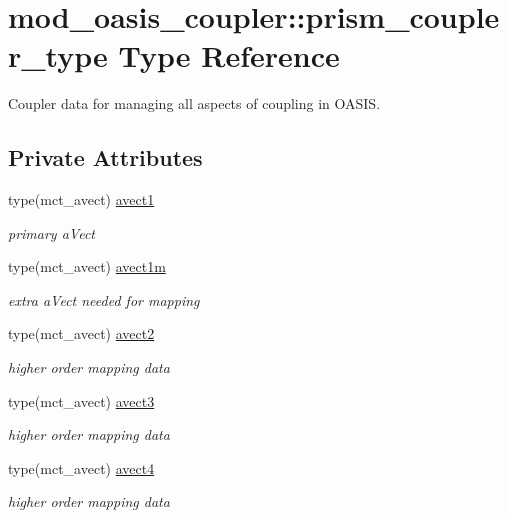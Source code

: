 \hypertarget{structmod__oasis__coupler_1_1prism__coupler__type}{\section{mod\+\_\+oasis\+\_\+coupler\+:\+:prism\+\_\+coupler\+\_\+type Type Reference}
\label{structmod__oasis__coupler_1_1prism__coupler__type}
}


Coupler data for managing all aspects of coupling in O\+A\+S\+I\+S.  


\subsection*{Private Attributes}
\begin{DoxyCompactItemize}
\item 
type(mct\+\_\+avect) \hyperlink{structmod__oasis__coupler_1_1prism__coupler__type_a153e0bf9e28c0a8ff4d8bb27c83f598e}{avect1}
\begin{DoxyCompactList}\small\item\em primary a\+Vect \end{DoxyCompactList}\item 
type(mct\+\_\+avect) \hyperlink{structmod__oasis__coupler_1_1prism__coupler__type_ab5626722caee601622658134916f12bf}{avect1m}
\begin{DoxyCompactList}\small\item\em extra a\+Vect needed for mapping \end{DoxyCompactList}\item 
type(mct\+\_\+avect) \hyperlink{structmod__oasis__coupler_1_1prism__coupler__type_a7cd1aa8e520cf036f4dd72ad2445b774}{avect2}
\begin{DoxyCompactList}\small\item\em higher order mapping data \end{DoxyCompactList}\item 
type(mct\+\_\+avect) \hyperlink{structmod__oasis__coupler_1_1prism__coupler__type_ac923618471bb31902062be4107d9bbf3}{avect3}
\begin{DoxyCompactList}\small\item\em higher order mapping data \end{DoxyCompactList}\item 
type(mct\+\_\+avect) \hyperlink{structmod__oasis__coupler_1_1prism__coupler__type_a478dda1acb9e270efda23a7275b21b83}{avect4}
\begin{DoxyCompactList}\small\item\em higher order mapping data \end{DoxyCompactList}\item 

\end{DoxyCompactItemize}
